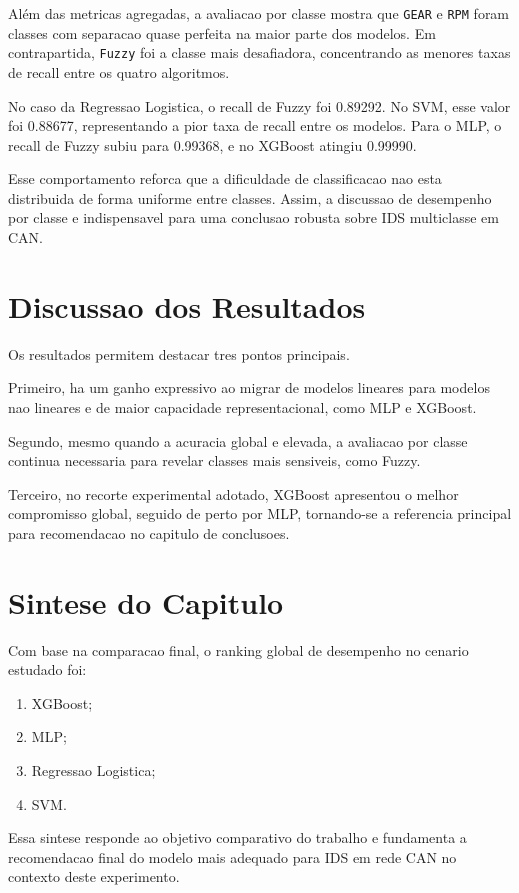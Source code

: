 Além das metricas agregadas, a avaliacao por classe mostra que \texttt{GEAR} e \texttt{RPM} foram classes com separacao quase perfeita na maior parte dos modelos. Em contrapartida, \texttt{Fuzzy} foi a classe mais desafiadora, concentrando as menores taxas de recall entre os quatro algoritmos.

No caso da Regressao Logistica, o recall de Fuzzy foi 0.89292. No SVM, esse valor foi 0.88677, representando a pior taxa de recall entre os modelos. Para o MLP, o recall de Fuzzy subiu para 0.99368, e no XGBoost atingiu 0.99990.

Esse comportamento reforca que a dificuldade de classificacao nao esta distribuida de forma uniforme entre classes. Assim, a discussao de desempenho por classe e indispensavel para uma conclusao robusta sobre IDS multiclasse em CAN.

\section{Discussao dos Resultados}

Os resultados permitem destacar tres pontos principais.

Primeiro, ha um ganho expressivo ao migrar de modelos lineares para modelos nao lineares e de maior capacidade representacional, como MLP e XGBoost.

Segundo, mesmo quando a acuracia global e elevada, a avaliacao por classe continua necessaria para revelar classes mais sensiveis, como Fuzzy.

Terceiro, no recorte experimental adotado, XGBoost apresentou o melhor compromisso global, seguido de perto por MLP, tornando-se a referencia principal para recomendacao no capitulo de conclusoes.

\section{Sintese do Capitulo}

Com base na comparacao final, o ranking global de desempenho no cenario estudado foi:

\begin{enumerate}
    \item XGBoost;
    \item MLP;
    \item Regressao Logistica;
    \item SVM.
\end{enumerate}

Essa sintese responde ao objetivo comparativo do trabalho e fundamenta a recomendacao final do modelo mais adequado para IDS em rede CAN no contexto deste experimento.

